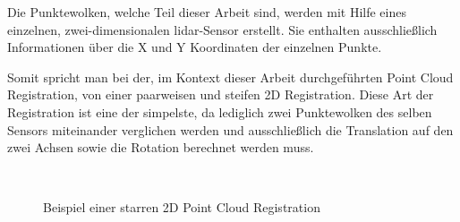 Die Punktewolken, welche Teil dieser Arbeit sind, werden mit Hilfe eines einzelnen, zwei-dimensionalen \ac{lidar}-Sensor erstellt.
Sie enthalten ausschließlich Informationen über die X und Y Koordinaten der einzelnen Punkte.

Somit spricht man bei der, im Kontext dieser Arbeit durchgeführten Point Cloud Registration, von einer paarweisen und steifen 2D Registration.
Diese Art der Registration ist eine der simpelste, da lediglich zwei Punktewolken des selben Sensors miteinander verglichen werden 
und ausschließlich die Translation auf den zwei Achsen sowie die Rotation berechnet werden muss.

\begin{figure}[H]
    \centering
     \\
    \caption{Beispiel einer starren 2D Point Cloud Registration}
    \label{fig:registrationExample}
\end{figure}

